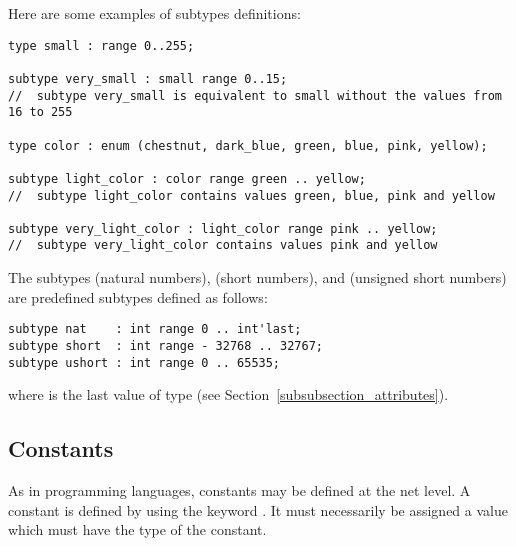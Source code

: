 Here are some examples of subtypes definitions:
\begin{lstlisting}
type small : range 0..255;

subtype very_small : small range 0..15;
//  subtype very_small is equivalent to small without the values from 16 to 255

type color : enum (chestnut, dark_blue, green, blue, pink, yellow);

subtype light_color : color range green .. yellow;
//  subtype light_color contains values green, blue, pink and yellow

subtype very_light_color : light_color range pink .. yellow;
//  subtype very_light_color contains values pink and yellow
\end{lstlisting}
The subtypes  (natural numbers),  (short numbers),
and  (unsigned short numbers) are predefined subtypes
defined as follows:
\begin{lstlisting}
subtype nat    : int range 0 .. int'last;
subtype short  : int range - 32768 .. 32767;
subtype ushort : int range 0 .. 65535;
\end{lstlisting}
where  is the last value of type  (see
Section~\ref{subsubsection_attributes}).\\

\subtypedef



\subsection{Constants}
\label{sec:constants}
As in programming languages, constants may be defined at the net
level.  A constant is defined by using the keyword .  It
must necessarily be assigned a value which must have the type of the
constant.\\

\constantdef




